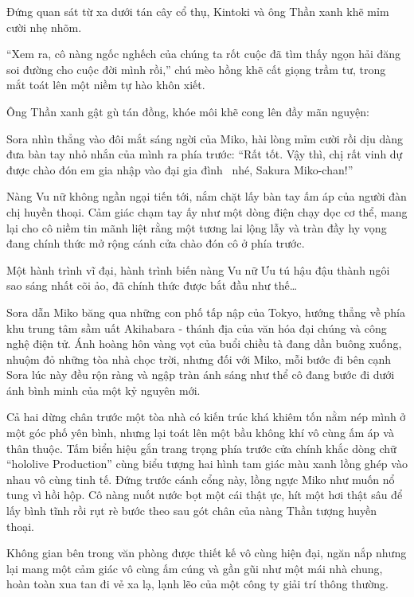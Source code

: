 \documentclass[../main.tex]{subfiles}
\begin{document}
Đứng quan sát từ xa dưới tán cây cổ thụ, Kintoki và ông Thần xanh khẽ mỉm cười nhẹ nhõm.

``Xem ra, cô nàng ngốc nghếch của chúng ta rốt cuộc đã tìm thấy ngọn hải đăng soi đường cho cuộc đời mình rồi,'' chú mèo hồng khẽ cất giọng trầm tư, trong mắt toát lên một niềm tự hào khôn xiết.

Ông Thần xanh gật gù tán đồng, khóe môi khẽ cong lên đầy mãn nguyện: 

Sora nhìn thẳng vào đôi mắt sáng ngời của Miko, hài lòng mỉm cười rồi dịu dàng đưa bàn tay nhỏ nhắn của mình ra phía trước: ``Rất tốt. Vậy thì, chị rất vinh dự được chào đón em gia nhập vào đại gia đình \hll\ nhé, Sakura Miko-chan!''

Nàng Vu nữ không ngần ngại tiến tới, nắm chặt lấy bàn tay ấm áp của người đàn chị huyền thoại. Cảm giác chạm tay ấy như một dòng điện chạy dọc cơ thể, mang lại cho cô niềm tin mãnh liệt rằng một tương lai lộng lẫy và tràn đầy hy vọng đang chính thức mở rộng cánh cửa chào đón cô ở phía trước.

Một hành trình vĩ đại, hành trình biến nàng Vu nữ Ưu tú hậu đậu thành ngôi sao sáng nhất cõi ảo, đã chính thức được bắt đầu như thế\dots

\il

\ct

Sora dẫn Miko băng qua những con phố tấp nập của Tokyo, hướng thẳng về phía khu trung tâm sầm uất Akihabara - thánh địa của văn hóa đại chúng và công nghệ điện tử. Ánh hoàng hôn vàng vọt của buổi chiều tà đang dần buông xuống, nhuộm đỏ những tòa nhà chọc trời, nhưng đối với Miko, mỗi bước đi bên cạnh Sora lúc này đều rộn ràng và ngập tràn ánh sáng như thể cô đang bước đi dưới ánh bình minh của một kỷ nguyên mới.

Cả hai dừng chân trước một tòa nhà có kiến trúc khá khiêm tốn nằm nép mình ở một góc phố yên bình, nhưng lại toát lên một bầu không khí vô cùng ấm áp và thân thuộc. Tấm biển hiệu gắn trang trọng phía trước cửa chính khắc dòng chữ ``hololive Production'' cùng biểu tượng hai hình tam giác màu xanh lồng ghép vào nhau vô cùng tinh tế. Đứng trước cánh cổng này, lồng ngực Miko như muốn nổ tung vì hồi hộp. Cô nàng nuốt nước bọt một cái thật ực, hít một hơi thật sâu để lấy bình tĩnh rồi rụt rè bước theo sau gót chân của nàng Thần tượng huyền thoại.

Không gian bên trong văn phòng được thiết kế vô cùng hiện đại, ngăn nắp nhưng lại mang một cảm giác vô cùng ấm cúng và gần gũi như một mái nhà chung, hoàn toàn xua tan đi vẻ xa lạ, lạnh lẽo của một công ty giải trí thông thường.
\end{document}
